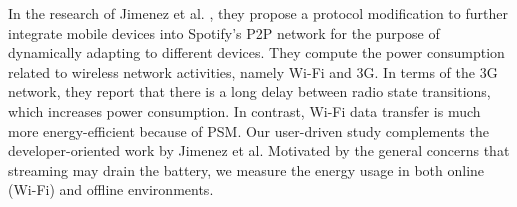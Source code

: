 In the research of Jimenez et al. \cite{jimenez2013integrating}, they propose a protocol modification to further integrate mobile devices into Spotify’s P2P network for the purpose of dynamically adapting to different devices. They compute the power consumption related to wireless network activities, namely Wi-Fi and 3G. In terms of the 3G network, they report that there is a long delay between radio state transitions, which increases power consumption. In contrast, Wi-Fi data transfer is much more energy-efficient because of PSM. Our user-driven study complements the developer-oriented work by Jimenez et al. Motivated by the general concerns that streaming may drain the battery, we measure the energy usage in both {\color{blue}online (\ie Wi-Fi) and offline environments}. 


